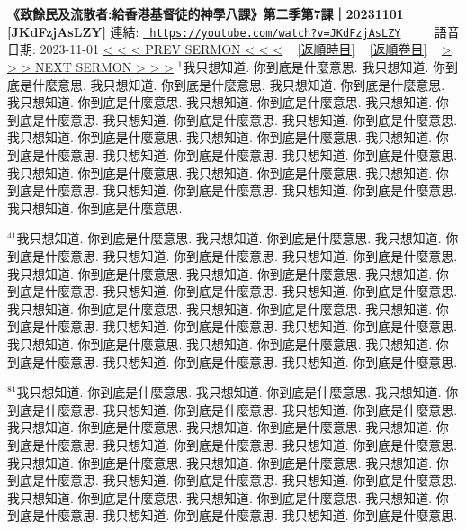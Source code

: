 \documentclass{book}
\begin{document}
\section{}
\label{sec:JKdFzjAsLZY}
\textbf{《致餘民及流散者:給香港基督徒的神學八課》第二季第7課｜20231101 [JKdFzjAsLZY]}
\newline
\newline
連結: \href{https://youtube.com/watch?v=JKdFzjAsLZY}{\texttt{ https://youtube.com/watch?v=JKdFzjAsLZY}} ~~~~ 語音日期: 2023-11-01 
\newline
\newline
\hyperref[sec:BDg16RM34JI]{\small{< < < PREV SERMON < < <}}
~
\hyperref[sec:index_chronic]{\small{[返順時目]}}
~
\hyperref[sec:index_scriptual]{\small{[返順卷目]}}
~
\hyperref[sec:_cxLnHL_TWQ]{\small{> > > NEXT SERMON > > >}}
\newline
\newline
$^{1}$我只想知道.
你到底是什麼意思.
我只想知道.
你到底是什麼意思.
我只想知道.
你到底是什麼意思.
我只想知道.
你到底是什麼意思.
我只想知道.
你到底是什麼意思.
我只想知道.
你到底是什麼意思.
我只想知道.
你到底是什麼意思.
我只想知道.
你到底是什麼意思.
我只想知道.
你到底是什麼意思.
我只想知道.
你到底是什麼意思.
我只想知道.
你到底是什麼意思.
我只想知道.
你到底是什麼意思.
我只想知道.
你到底是什麼意思.
我只想知道.
你到底是什麼意思.
我只想知道.
你到底是什麼意思.
我只想知道.
你到底是什麼意思.
我只想知道.
你到底是什麼意思.
我只想知道.
你到底是什麼意思.
我只想知道.
你到底是什麼意思.
我只想知道.
你到底是什麼意思.

$^{41}$我只想知道.
你到底是什麼意思.
我只想知道.
你到底是什麼意思.
我只想知道.
你到底是什麼意思.
我只想知道.
你到底是什麼意思.
我只想知道.
你到底是什麼意思.
我只想知道.
你到底是什麼意思.
我只想知道.
你到底是什麼意思.
我只想知道.
你到底是什麼意思.
我只想知道.
你到底是什麼意思.
我只想知道.
你到底是什麼意思.
我只想知道.
你到底是什麼意思.
我只想知道.
你到底是什麼意思.
我只想知道.
你到底是什麼意思.
我只想知道.
你到底是什麼意思.
我只想知道.
你到底是什麼意思.
我只想知道.
你到底是什麼意思.
我只想知道.
你到底是什麼意思.
我只想知道.
你到底是什麼意思.
我只想知道.
你到底是什麼意思.
我只想知道.
你到底是什麼意思.

$^{81}$我只想知道.
你到底是什麼意思.
我只想知道.
你到底是什麼意思.
我只想知道.
你到底是什麼意思.
我只想知道.
你到底是什麼意思.
我只想知道.
你到底是什麼意思.
我只想知道.
你到底是什麼意思.
我只想知道.
你到底是什麼意思.
我只想知道.
你到底是什麼意思.
我只想知道.
你到底是什麼意思.
我只想知道.
你到底是什麼意思.
我只想知道.
你到底是什麼意思.
我只想知道.
你到底是什麼意思.
我只想知道.
你到底是什麼意思.
我只想知道.
你到底是什麼意思.
我只想知道.
你到底是什麼意思.
我只想知道.
你到底是什麼意思.
我只想知道.
你到底是什麼意思.
我只想知道.
你到底是什麼意思.
我只想知道.
你到底是什麼意思.
我只想知道.
你到底是什麼意思.
\end{document}
